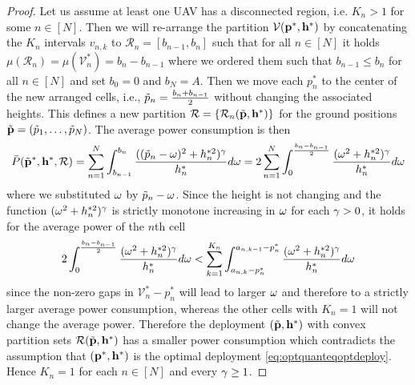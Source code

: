 \documentclass[smallabstract,smallcaptions]{dccpaper}
\newcommand{\Pbar}{\ensuremath{\bar{P}}}         %
\newcommand{\Vor}{\ensuremath{\mathcal{V}}}         %
\newcommand{\Rset}{\ensuremath{\mathcal R}}
\begin{document}
\begin{proof}
  Let us assume at least one UAV has a disconnected region, i.e. $K_n>1$ for some $n\in[N]$. Then we will re-arrange the
  partition $\Vor(\vp^*,\vh^*)$ by concatenating the $K_n$ intervals $v_{n,k}$ to $\Rset_n=[b_{n-1},b_{n}]$ such that for
  all $n\in[N]$ it holds $\mu(\Rset_n)=\mu(\Vor^*_n)=b_n-b_{n-1}$ where we ordered them such that $b_{n-1}\leq b_{n}$ for all $n\in[N]$
  and set $b_0=0$ and $b_N=A$. Then we move each $p_n^*$ to the center of the new arranged cells, i.e.,
  $\tilde{p}_n=\frac{b_n+b_{n-1}}{2}$ without changing the associated heights. This defines a new partition
  $\Rset=\{\Rset_n(\tvp,\vh^*)\}$ for the ground positions $\tilde{{\mathbf p}}=(\tilde{p}_1,\dots,\tilde{p}_N)$. The average power consumption is then
  \begin{align}
    \Pbar(\tvp^*,\vh^*,\Rset)=\sum_{n=1}^N \int_{b_{n-1}}^{b_n} \frac{ ((\tp_n-\ome)^2+h_n^{*2})^{\gam}}{h_n^{*}} d\ome
= 2\sum_{n=1}^N \int_{0}^{\frac{b_n-b_{n-1}}{2}} \frac{ (\ome^2+h_n^{*2})^{\gam}}{h_n^{*}} d\ome
  \end{align}
  where we substituted $\omega$ by $\tilde{p}_n-\omega$. Since the height is not changing and the function
  $(\omega^2+h_n^{*2})^{\gamma}$ is strictly monotone increasing in $\omega$ for each $\gamma>0$, it holds for the average power
  of the $n$th cell 
  \begin{align}
    2\int_{0}^{\frac{b_n-b_{n-1}}{2}} \frac{ (\omega^2+h_n^{*2})^{\gamma}}{h_n^{*}} d\omega 
    < \sum_{k=1}^{K_n}\int_{a_{n,k}-p_n^*}^{a_{n,k-1}-p_n^*} \frac{ (\omega^2+h_n^{*2})^{\gamma}}{h_n^{*}} d\omega
  \end{align}
  since the non-zero gaps in $\Vor_n^*-p_n^*$ will lead to larger $\omega$ and therefore to a strictly larger average
  power consumption, whereas the other cells with $K_n=1$ will not change the average power.  Therefore the deployment
  $(\tilde{{\mathbf p}},{\mathbf h}^*)$ with convex partition sets  $\Rset(\tvp,\vh^*)$ has a smaller power consumption which contradicts 
  the assumption that $({\mathbf p}^*,{\mathbf h}^*)$ is the optimal deployment \eqref{eq:optquanteqoptdeploy}. Hence $K_n=1$ for each
  $n\in[N]$ and every $\gamma\geq 1$.


    







\end{proof}
\end{document}
